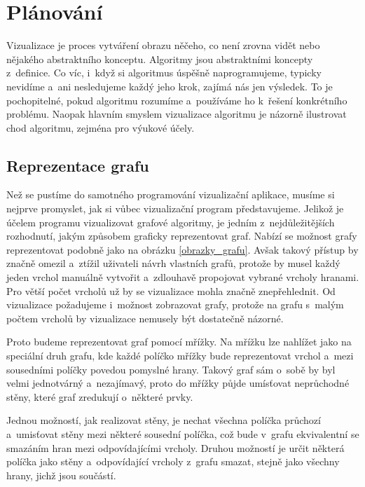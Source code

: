 \documentclass[12pt]{report}			%
\begin{document}

		\chapter{Plánování}
			Vizualizace je proces vytváření obrazu něčeho, co není zrovna vidět nebo nějakého abstraktního konceptu. Algoritmy jsou abstraktními koncepty z~definice. Co víc, i~když si algoritmus úspěšně naprogramujeme, typicky nevidíme a~ani nesledujeme každý jeho krok, zajímá nás jen výsledek. To je pochopitelné, pokud algoritmu rozumíme a~používáme ho k~řešení konkrétního problému. Naopak hlavním smyslem vizualizace algoritmu je názorně ilustrovat chod algoritmu, zejména pro výukové účely.
			\section{Reprezentace grafu}
			Než se pustíme do samotného programování vizualizační aplikace, musíme si nejprve promyslet, jak si vůbec vizualizační program představujeme. 
			Jelikož je účelem programu vizualizovat grafové algoritmy, je jedním z~nejdůležitějších rozhodnutí, jakým způsobem graficky reprezentovat graf. Nabízí se možnost grafy reprezentovat podobně jako na obrázku \ref{obrazky_grafu}. Avšak takový přístup by značně omezil a~ztížil uživateli návrh vlastních grafů, protože by musel každý jeden vrchol manuálně vytvořit a~zdlouhavě propojovat vybrané vrcholy hranami. Pro větší počet vrcholů už by se vizualizace mohla značně znepřehlednit. Od vizualizace požadujeme i~možnost zobrazovat  grafy, protože na grafu s~malým počtem vrcholů by vizualizace nemusely být dostatečně názorné.
			
			Proto budeme reprezentovat graf pomocí mřížky. Na mřížku lze nahlížet jako na speciální druh grafu, kde každé políčko mřížky bude reprezentovat vrchol a~mezi sousedními políčky povedou pomyslné hrany. Takový graf sám o~sobě by byl velmi jednotvárný a~nezajímavý, proto do mřížky půjde umísťovat neprůchodné stěny, které graf zredukují o~některé prvky. 
			
			Jednou možností, jak realizovat stěny, je nechat všechna políčka průchozí a~umisťovat stěny mezi některé sousední políčka, což bude v~grafu ekvivalentní se smazáním hran mezi odpovídajícími vrcholy. Druhou možností je určit některá políčka jako stěny a~odpovídající vrcholy z~grafu smazat, stejně jako všechny hrany, jichž jsou součástí. 
			
\end{document}
